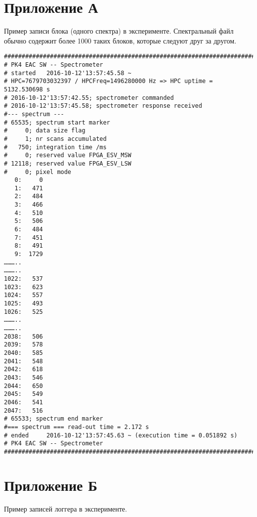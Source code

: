 
\chapter{Приложение А}
\label{app:app1}
Пример записи блока (одного спектра) в эксперименте. Спектральный файл обычно содержит более 1000 таких блоков, которые
следуют друг за другом.

\begin{small}
\begin{verbatim}
#########################################################################
# PK4 EAC SW -- Spectrometer
# started   2016-10-12'13:57:45.58 ~
# HPC=7679703032397 / HPCFreq=1496280000 Hz => HPC uptime = 5132.530698 s
# 2016-10-12'13:57:42.55; spectrometer commanded
# 2016-10-12'13:57:45.58; spectrometer response received
#--- spectrum ---
# 65535; spectrum start marker
#     0; data size flag
#     1; nr scans accumulated
#   750; integration time /ms
#     0; reserved value FPGA_ESV_MSW
# 12118; reserved value FPGA_ESV_LSW
#     0; pixel mode
   0:     0
   1:   471
   2:   484
   3:   466
   4:   510
   5:   506
   6:   484
   7:   451
   8:   491
   9:  1729
………..
………..
1022:   537
1023:   623
1024:   557
1025:   493
1026:   525
………..
………..
2038:   506
2039:   578
2040:   585
2041:   548
2042:   618
2043:   546
2044:   650
2045:   549
2046:   541
2047:   516
# 65533; spectrum end marker
#=== spectrum === read-out time = 2.172 s
# ended     2016-10-12'13:57:45.63 ~ (execution time = 0.051892 s)
# PK4 EAC SW -- Spectrometer
#########################################################################
\end{verbatim}
\end{small}

\chapter{Приложение Б}
\label{app:app2}
Пример записей логгера в эксперименте.

